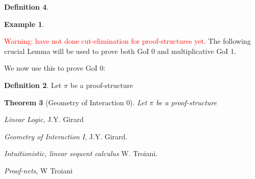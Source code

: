 \documentclass[12pt]{article}
\theoremstyle{plain}
\newtheorem{thm}{Theorem}[subsection] %
\theoremstyle{definition}
\newtheorem{defn}[thm]{Definition} %
\newtheorem{example}[thm]{Example}
\begin{document}
\begin{defn}
\begin{example}
\end{example}
\textcolor{red}{Warning: have not done cut-elimination for proof-structures yet.}
The following crucial Lemma will be used to prove both GoI 0 and multiplicative GoI 1.

We now use this to prove GoI 0:
\begin{defn}
Let $\pi$ be a proof-structure
\end{defn}




\begin{thm}[Geometry of Interaction 0]
Let $\pi$ be a proof-structure 
\end{thm}


\end{defn}










\begin{thebibliography}{9}
 \emph{Linear Logic}, J.Y. Girard

 \emph{Geometry of Interaction I}, J.Y. Girard.

 \emph{Intuitionistic, linear sequent calculus} W. Troiani.

 \emph{Proof-nets}, W Troiani

\end{thebibliography}
\end{document}
